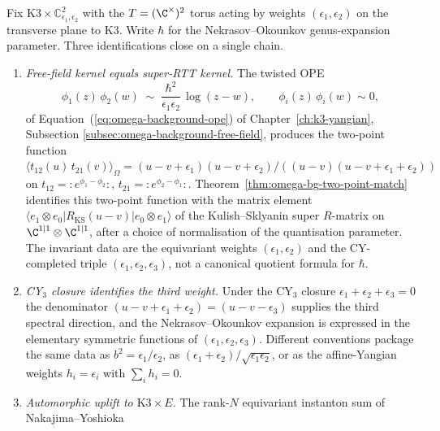 \begin{theorem}
\label{rem:k3e-omega-free-field-link}
Fix $\mathrm K3 \times \mathbb C^2_{\epsilon_1, \epsilon_2}$ with the
$T = (\C^\times)^2$ torus acting by weights $(\epsilon_1, \epsilon_2)$
on the transverse plane to K3. Write $\hbar$ for the Nekrasov--Okounkov
genus-expansion parameter. Three identifications close on a single
chain.
\begin{enumerate}[label=\textup{(\roman*)}]
\item \emph{Free-field kernel equals super-RTT kernel.} The twisted OPE
\begin{equation}\label{eq:k3qt-omega-ope-chain}
 \phi_1(z)\, \phi_2(w) \;\sim\;
 \frac{\hbar^2}{\epsilon_1\epsilon_2}\,\log(z - w),
 \qquad \phi_i(z)\,\phi_i(w)\sim 0,
\end{equation}
of Equation~(\ref{eq:omega-background-ope}) of
Chapter~\ref{ch:k3-yangian}, Subsection
\ref{subsec:omega-background-free-field}, produces the two-point
function
$\langle t_{12}(u)\, t_{21}(v)\rangle_\Omega =
(u - v + \epsilon_1)(u - v + \epsilon_2)/((u - v)(u - v + \epsilon_1 + \epsilon_2))$
on $t_{12} = {:}e^{\phi_1 - \phi_2}{:}$,
$t_{21} = {:}e^{\phi_2 - \phi_1}{:}$.
Theorem~\ref{thm:omega-bg-two-point-match} identifies this two-point
function with the matrix element
$\langle e_1 \otimes e_0 | R_{\mathrm{KS}}(u - v) | e_0 \otimes e_1\rangle$
of the Kulish--Sklyanin super $R$-matrix on
\(\C^{1 \mid 1} \otimes \C^{1 \mid 1}\), after a choice of
normalisation of the quantisation parameter.  The invariant data are the
equivariant weights \((\epsilon_1,\epsilon_2)\) and the CY-completed
triple \((\epsilon_1,\epsilon_2,\epsilon_3)\), not a canonical quotient
formula for \(\hbar\).
\item \emph{CY$_3$ closure identifies the third weight.} Under the
CY$_3$ closure $\epsilon_1 + \epsilon_2 + \epsilon_3 = 0$ the
denominator $(u - v + \epsilon_1 + \epsilon_2) = (u - v - \epsilon_3)$
supplies the third spectral direction, and the Nekrasov--Okounkov
expansion is expressed in the elementary symmetric functions of
\((\epsilon_1,\epsilon_2,\epsilon_3)\).  Different conventions package
the same data as \(b^2=\epsilon_1/\epsilon_2\), as
\((\epsilon_1+\epsilon_2)/\sqrt{\epsilon_1\epsilon_2}\), or as the
affine-Yangian weights \(h_i=\epsilon_i\) with \(\sum_i h_i=0\).
\item \emph{Automorphic uplift to $\mathrm K3 \times E$.} The rank-$N$
equivariant instanton sum of Nakajima--Yoshioka

\end{enumerate}
\end{theorem}

